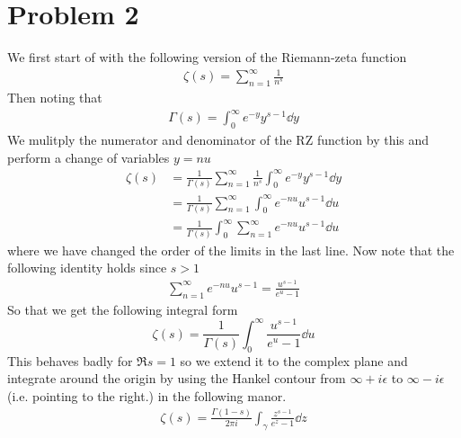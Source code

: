 \documentclass[a4paper,12pt]{article}
\begin{document}
\section*{Problem 2}
We first start of with the following version of the Riemann-zeta function
\begin{equation}
	\begin{aligned}
		\zeta (s)=\sum_{n=1}^{\infty}\frac{1}{n^s}
	\end{aligned}
\end{equation}
Then noting that
\begin{equation}
	\begin{aligned}
		\Gamma(s)=\int_{0}^{\infty}e^{-y}y^{s-1}\dd y
	\end{aligned}
\end{equation}
We mulitply the numerator and denominator of the RZ function by this and perform a change of variables $y= nu$
\begin{equation}
	\begin{aligned}
		\zeta (s)&=\frac{1}{\Gamma(s)}\sum_{n=1}^{\infty}\frac{1}{n^s}\int_{0}^{\infty}e^{-y}y^{s-1}\dd y\\
		&=\frac{1}{\Gamma(s)}\sum_{n=1}^{\infty}\int_{0}^{\infty}e^{-nu}u^{s-1}\dd u\\
		&=\frac{1}{\Gamma(s)}\int_{0}^{\infty}\sum_{n=1}^{\infty}e^{-nu}u^{s-1}\dd u
	\end{aligned}
\end{equation}
where we have changed the order of the limits in the last line. Now note that the following identity holds since $s>1$
\begin{equation}
	\begin{aligned}
		\sum_{n=1}^{\infty} e^{-nu}u^{s-1}= \frac{u^{s-1}}{e^{u}-1}
	\end{aligned}
\end{equation}
So that we get the following integral form
\begin{equation}\label{eq:gammafunc}
\zeta(s)=\frac{1}{\Gamma(s)}\int_0^\infty \frac{u^{s-1}}{e^{u}-1}\dd u
\end{equation}
This behaves badly for $\Re s=1$ so we extend it to the complex plane and integrate around the origin by using the Hankel contour from $\infty+i\epsilon$ to $\infty-i\epsilon$ (i.e. pointing to the right.) in the following manor.
\begin{equation}
	\begin{aligned}
		\zeta(s)=\frac{\Gamma(1-s)}{2\pi i}\int_\gamma \frac{z^{s-1}}{e^{z}-1} \dd z
	\end{aligned}
\end{equation}
\end{document}
